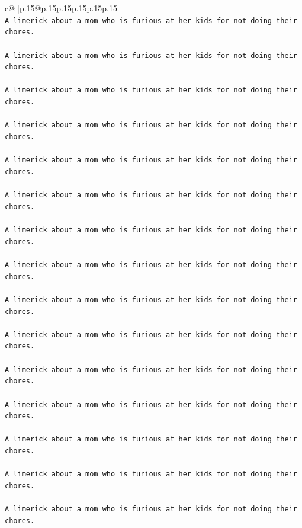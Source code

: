 \documentclass{article}
\begin{document}
{\begin{supertabular}{c@{$\;$}|p{.15\linewidth}@{}p{.15\linewidth}p{.15\linewidth}p{.15\linewidth}p{.15\linewidth}p{.15\linewidth}}
{{{\\ 
\texttt{A limerick about a mom who is furious at her kids for not doing their chores.} \\
\\ 
\texttt{A limerick about a mom who is furious at her kids for not doing their chores.} \\
\\ 
\texttt{A limerick about a mom who is furious at her kids for not doing their chores.} \\
\\ 
\texttt{A limerick about a mom who is furious at her kids for not doing their chores.} \\
\\ 
\texttt{A limerick about a mom who is furious at her kids for not doing their chores.} \\
\\ 
\texttt{A limerick about a mom who is furious at her kids for not doing their chores.} \\
\\ 
\texttt{A limerick about a mom who is furious at her kids for not doing their chores.} \\
\\ 
\texttt{A limerick about a mom who is furious at her kids for not doing their chores.} \\
\\ 
\texttt{A limerick about a mom who is furious at her kids for not doing their chores.} \\
\\ 
\texttt{A limerick about a mom who is furious at her kids for not doing their chores.} \\
\\ 
\texttt{A limerick about a mom who is furious at her kids for not doing their chores.} \\
\\ 
\texttt{A limerick about a mom who is furious at her kids for not doing their chores.} \\
\\ 
\texttt{A limerick about a mom who is furious at her kids for not doing their chores.} \\
\\ 
\texttt{A limerick about a mom who is furious at her kids for not doing their chores.} \\
\\ 
\texttt{A limerick about a mom who is furious at her kids for not doing their chores.} \\
}}}
\end{supertabular}}
\end{document}
